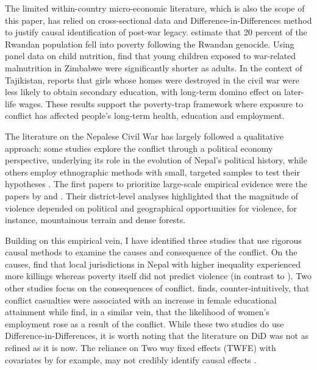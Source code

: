 \documentclass[12pt,a4paper]{article}
\begin{document}
The limited within-country micro-economic literature, which is also the scope of this paper, has relied on cross-sectional data and Difference-in-Differences method to justify causal identification of post-war legacy. \textcite{justino2013poverty} estimate that 20 percent of the Rwandan population fell into poverty following the Rwandan genocide. Using panel data on child nutrition, \textcite{alderman2006long} find that young children exposed to war-related malnutrition in Zimbabwe were significantly shorter as adults. In the context of Tajikistan, \textcite{shemyakina2011effect} reports that girls whose homes were destroyed in the civil war were less likely to obtain secondary education, with long-term domino effect on later-life wages. These results support the poverty-trap framework where exposure to conflict has affected people's long-term health, education and employment.

The literature on the Nepalese Civil War has largely followed a qualitative approach: some studies explore the conflict through a political economy perspective, underlying its role in the evolution of Nepal’s political history, while others employ ethnographic methods with small, targeted samples to test their hypotheses \parencite{lawoti2010maoist}. The first papers to prioritize large-scale empirical evidence were the papers by \textcite{bohara2006opportunity} and \textcite{do2010geography}. Their district-level analyses highlighted that the magnitude of violence depended on political and geographical opportunities for violence, for instance, mountainous terrain and dense forests. 

Building on this empirical vein, I have identified three studies that use rigorous causal methods to examine the causes and consequence of the conflict. On the causes, \textcite{nepal2011more} find that local jurisdictions in Nepal with higher inequality experienced more killings whereas poverty itself did not predict violence (in contrast to \parencite{do2010geography}). Two other studies focus on the consequences of conflict. \textcite{valente2014education} finds, counter-intuitively, that conflict casualties were associated with an increase in female educational attainment while \textcite{menon2015war} find, in a similar vein, that the likelihood of women's employment rose as a result of the conflict. While these two studies do use Difference-in-Differences, it is worth noting that the literature on DiD was not as refined as it is now. The reliance on Two way fixed effects (TWFE) with covariates by \textcite{menon2015war} for example, may not credibly identify causal effects \parencite{goodman2021difference}.
\end{document}
